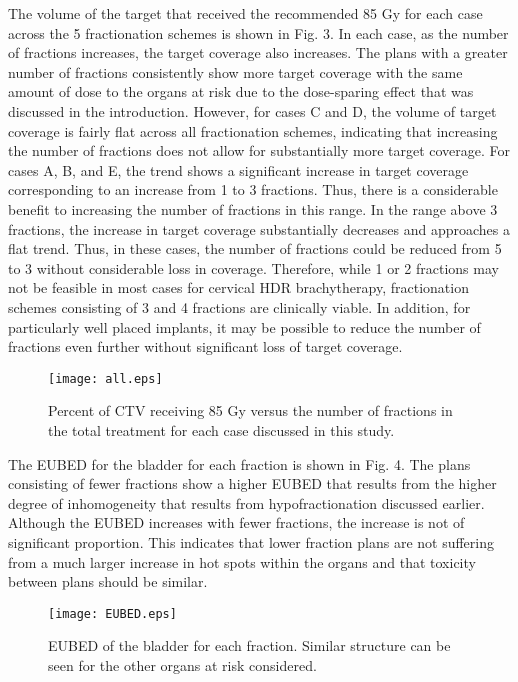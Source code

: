 \documentclass[osajnl,twocolumn,showpacs,superscriptaddress,10pt]{revtex4-1}
\begin{document}
The volume of the target that received the recommended 85 Gy for each case across the 5 fractionation schemes is shown in Fig. 3. In each case, as the number of fractions increases, the target coverage also increases. The plans with a greater number of fractions consistently show more target coverage with the same amount of dose to the organs at risk due to the dose-sparing effect that was discussed in the introduction. However, for cases C and D, the volume of target coverage is fairly flat across all fractionation schemes, indicating that increasing the number of fractions does not allow for substantially more target coverage. For cases A, B, and E, the trend shows a significant increase in target coverage corresponding to an increase from 1 to 3 fractions. Thus, there is a considerable benefit to increasing the number of fractions in this range. In the range above 3 fractions, the increase in target coverage substantially decreases and approaches a flat trend. Thus, in these cases, the number of fractions could be reduced from 5 to 3 without considerable loss in coverage. Therefore, while 1 or 2 fractions may not be feasible in most cases for cervical HDR brachytherapy, fractionation schemes consisting of 3 and 4 fractions are clinically viable. In addition, for particularly well placed implants, it may be possible to reduce the number of fractions even further without significant loss of target coverage.

\begin{figure}\label{fig:main}
\centering
\texttt{[image: all.eps]}
\caption{Percent of CTV receiving 85 Gy versus the number of fractions in the total treatment for each case discussed in this study.}
\end{figure}

The EUBED for the bladder for each fraction is shown in Fig. 4. The plans consisting of fewer fractions show a higher EUBED that results from the higher degree of inhomogeneity that results from hypofractionation discussed earlier. Although the EUBED increases with fewer fractions, the increase is not of significant proportion. This indicates that lower fraction plans are not suffering from a much larger increase in hot spots within the organs and that toxicity between plans should be similar. 

\begin{figure}\label{fig:eubed}
\centering
\texttt{[image: EUBED.eps]}
\caption{EUBED of the bladder for each fraction. Similar structure can be seen for the other organs at risk considered.}
\end{figure}
\end{document}
